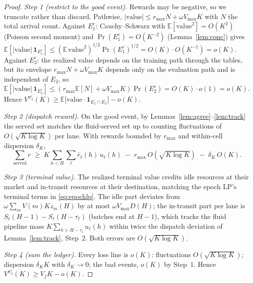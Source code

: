 \documentclass[11pt]{article}
\newcommand{\pol}{\pi_{\lambda}}
\begin{document}
\begin{proof}
\emph{Step 1 (restrict to the good event).} Rewards may be negative,
so we truncate rather than discard. Pathwise,
$|\text{value}| \leq r_{\max} N + \omega V_{\max} K$ with $N$ the
total arrival count. Against $E_1^c$: Cauchy--Schwarz with
$\mathbb{E}[\text{value}^2] = O(K^2)$ (Poisson second moment) and
$\Pr(E_1^c) = O(K^{-2})$ (Lemma~\ref{lem:conc}) gives
$\mathbb{E}[|\text{value}|\,\mathbf{1}_{E_1^c}]
\leq (\mathbb{E}\,\text{value}^2)^{1/2} \Pr(E_1^c)^{1/2}
= O(K) \cdot O(K^{-1}) = o(K)$. Against $E_2^c$: the realized value depends on the training path
through the tables, but its envelope
$r_{\max} N + \omega V_{\max} K$ depends only on the evaluation
path and is independent of $E_2$, so
$\mathbb{E}[|\text{value}|\,\mathbf{1}_{E_2^c}]
\leq (r_{\max} \mathbb{E}[N] + \omega V_{\max} K) \Pr(E_2^c)
= O(K) \cdot o(1) = o(K)$. Hence
$V^{\pol^{\varepsilon}}(K) \geq
\mathbb{E}\bigl[ \text{value} \cdot \mathbf{1}_{E_1 \cap E_2} \bigr]
- o(K)$.

\emph{Step 2 (dispatch reward).} On the good event, by
Lemmas~\ref{lem:agree}--\ref{lem:track} the served set matches the
fluid-served set up to counting fluctuations of
$O(\sqrt{K \log K})$ per lane. With rewards bounded by $r_{\max}$ and
within-cell dispersion $\delta_K$,
\begin{equation}
  \sum_{\text{served}} r
  \;\geq\; K \sum_{h < H} \sum_{\ell} \bar{r}_{\ell}(h)\, u_{\ell}(h)
  \;-\; r_{\max}\, O(\sqrt{K \log K})
  \;-\; \delta_K\, O(K).
\end{equation}

\emph{Step 3 (terminal value).} The realized terminal value credits
idle resources at their market and in-transit resources at their
destination, matching the epoch LP's terminal terms in
\eqref{eq:epochlp}. The idle part
deviates from $\omega \sum_m V(m) K z_m(H)$ by at most
$\omega V_{\max} D(H)$; the in-transit part per lane is
$S_{\ell}(H{-}1) - S_{\ell}(H - \tau_{\ell})$ (batches end at
$H{-}1$), which tracks the fluid
pipeline mass
$K \sum_{h > H - \tau_{\ell}} u_{\ell}(h)$ within twice the
dispatch deviation of Lemma~\ref{lem:track}, Step~2. Both errors are
$O(\sqrt{K \log K})$.

\emph{Step 4 (sum the ledger).} Every loss line is $o(K)$:
fluctuations $O(\sqrt{K \log K})$; dispersion $\delta_K K$ with
$\delta_K \to 0$; the bad events, $o(K)$ by Step~1.
Hence $V^{\pol^{\varepsilon}}(K) \geq V_f K - o(K)$.
\end{proof}
\end{document}
